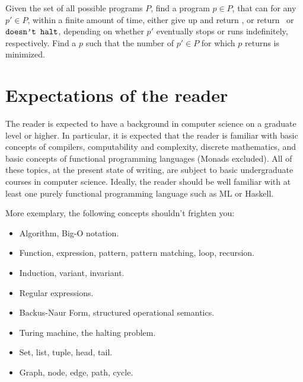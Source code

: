 \begin{definition} Given the set of all possible programs $P$, find a program
$p\in P$, that can for any $p'\in P$, within a finite amount of time, either
give up and return , or return \ or
$\text{{\ttfamily doesn't halt}}$, depending on whether $p'$ eventually stops or
runs indefinitely, respectively. Find a $p$ such that the number of $p'\in P$
for which $p$ returns  is minimized.\end{definition}

\section{Expectations of the reader}

The reader is expected to have a background in computer science on a graduate
level or higher. In particular, it is expected that the reader is familiar with
basic concepts of compilers, computability and complexity, discrete
mathematics, and basic concepts of functional programming languages (Monads
excluded). All of these topics, at the present state of writing, are subject to
basic undergraduate courses in computer science. Ideally, the reader should be
well familiar with at least one purely functional programming language such as
ML or Haskell.

More exemplary, the following concepts shouldn't frighten you:

\begin{itemize}

\item Algorithm, Big-O notation.

\item Function, expression, pattern, pattern matching, loop, recursion.

\item Induction, variant, invariant.

\item Regular expressions.

\item Backus-Naur Form, structured operational semantics.

\item Turing machine, the halting problem.

\item Set, list, tuple, head, tail.

\item Graph, node, edge, path, cycle.

\end{itemize}


